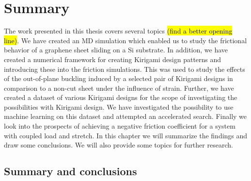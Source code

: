 \chapter{Summary}\label{chap:summary}

The work presented in this thesis covers several topics \hl{(find a better opening
line)}. We have created an \acrshort{MD} simulation which enabled us to study
the frictional behavior of a graphene sheet sliding on a Si substrate. In
addition, we have created a numerical framework for creating Kirigami design
patterns and introducing these into the friction simulations. This was used to
study the effects of the out-of-plane buckling induced by a selected pair of
Kirigami designs in comparison to a non-cut sheet under the influence of strain.
Further, we have created a dataset of various Kirigami designs for the scope of
investigating the possibilities with Kirigami design. We have investigated the
possibility to use machine learning on this dataset and attempted an accelerated
search. Finally we look into the prospects of achieving a negative friction
coefficient for a system with coupled load and stretch. In this chapter we will
summarize the findings and draw some conclusions. We will also provide
some topics for further research.

\section{Summary and conclusions}

